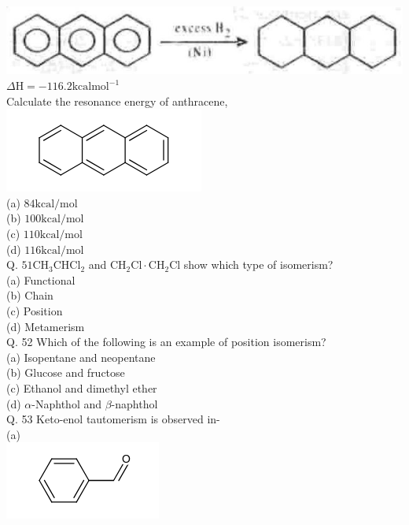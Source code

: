 \documentclass[10pt]{article}
\begin{document}
\includegraphics[max width=\textwidth, center]{2025_01_28_8470952b98110cec3aabg-136(1)}\\
$\Delta \mathrm{H}=-116.2 \mathrm{kcal} \mathrm{mol}^{-1}$\\
Calculate the resonance energy of anthracene,\\
\includegraphics{smile-8c3b075eb0967f64702d8dc75f1ffa8e1ab59917}\\
(a) $84 \mathrm{kcal} / \mathrm{mol}$\\
(b) $100 \mathrm{kcal} / \mathrm{mol}$\\
(c) $110 \mathrm{kcal} / \mathrm{mol}$\\
(d) $116 \mathrm{kcal} / \mathrm{mol}$\\
Q. $51 \mathrm{CH}_{3} \mathrm{CHCl}_{2}$ and $\mathrm{CH}_{2} \mathrm{Cl} \cdot \mathrm{CH}_{2} \mathrm{Cl}$ show which type of isomerism?\\
(a) Functional\\
(b) Chain\\
(c) Position\\
(d) Metamerism\\
Q. 52 Which of the following is an example of position isomerism?\\
(a) Isopentane and neopentane\\
(b) Glucose and fructose\\
(c) Ethanol and dimethyl ether\\
(d) $\alpha$-Naphthol and $\beta$-naphthol\\
Q. 53 Keto-enol tautomerism is observed in-\\
(a)\\
\includegraphics{smile-d7981b4bcc6b8defd6fe919a75511626bc07b456}\\
\end{document}
